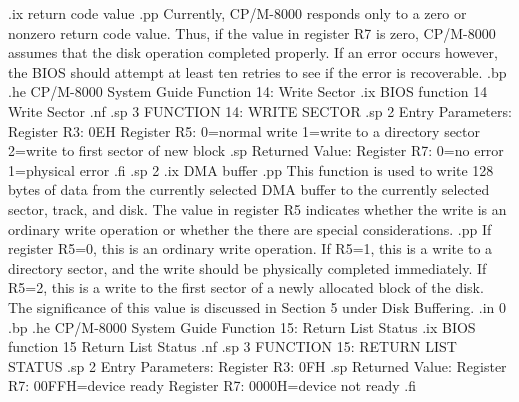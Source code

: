 .ix return code value
.pp
Currently, CP/M-8000 responds only to a zero or nonzero return code value.
Thus, if the value in register R7 is zero, CP/M-8000 assumes that the disk
operation completed properly.  If an error occurs however, the BIOS should
attempt at least ten retries to see if the error is recoverable.  
.bp
.he CP/M-8000 System Guide                  Function 14:  Write Sector
.ix BIOS function 14 Write Sector
.nf
.sp 3
                   FUNCTION 14:  WRITE SECTOR
.sp 2 
          Entry Parameters:    
             Register R3: 0EH
             Register R5: 0=normal write
                          1=write to a directory 
                              sector
                          2=write to first sector 
                              of new block
.sp
          Returned   Value:  
             Register R7: 0=no error
                          1=physical error
.fi
.sp 2
.ix DMA buffer
.pp
This function is used to write 128 bytes of data from the currently
selected DMA buffer to the currently selected sector, track, and disk.
The value in register R5 indicates whether the write is an ordinary
write operation or whether the there are special considerations.
.pp
If register R5=0, this is an ordinary write operation.  If
R5=1, this is a write to a directory sector, and the write should
be physically completed immediately.  If R5=2, this is a write
to the first sector of a newly allocated block of the disk.  The
significance of this value is discussed in Section 5 under Disk Buffering.
.in 0
.bp
.he CP/M-8000 System Guide            Function 15:  Return List Status
.ix BIOS function 15 Return List Status
.nf
.sp 3
                FUNCTION 15:  RETURN LIST STATUS
.sp 2 
            Entry Parameters:  
               Register R3: 0FH
.sp
            Returned   Value:  
                 Register R7: 00FFH=device ready
                 Register R7: 0000H=device not ready
.fi

